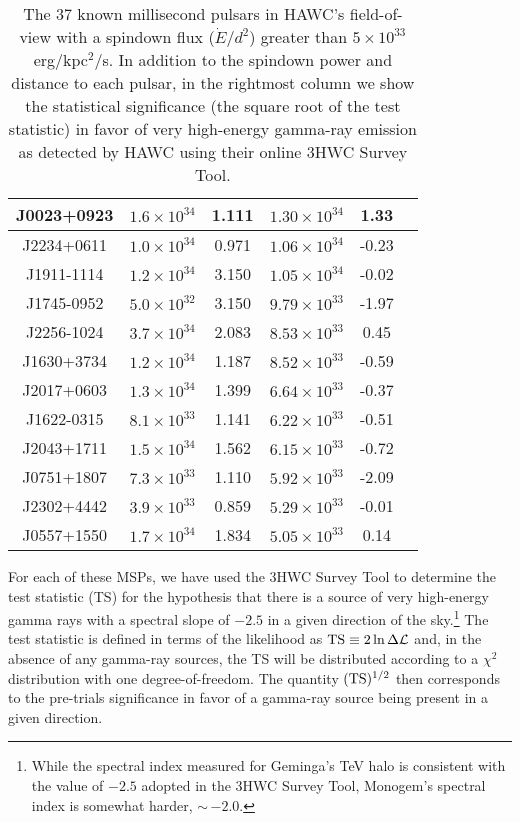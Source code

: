\documentclass[aps,prd,twocolumn,amsmath,superscriptaddress,amssymb,showpacs,floatfix,nofootinbib,longbibliography,preprintnumbers]{revtex4-1}
\begin{document}
\begin{table}[t]
\begin{tabular}{|c|c|c|c|c|c|}
\tabularnewline
\hline
J0023+0923 & $1.6\times 10^{34}$ & 1.111 & $1.30 \times 10^{34}$ & 1.33 
\tabularnewline
\hline
J2234+0611 & $1.0\times 10^{34}$ & 0.971 & $1.06 \times 10^{34}$ & -0.23 
\tabularnewline
\hline
J1911-1114 & $1.2\times 10^{34}$ & 3.150 & $1.05 \times 10^{34}$ & -0.02 
\tabularnewline
\hline
J1745-0952 & $5.0\times 10^{32}$ & 3.150 & $9.79 \times 10^{33}$ & -1.97 
\tabularnewline
\hline
J2256-1024 & $3.7\times 10^{34}$ & 2.083 & $8.53 \times 10^{33}$ & 0.45 
\tabularnewline
\hline
J1630+3734 & $1.2\times 10^{34}$ & 1.187 & $8.52 \times 10^{33}$ & -0.59 
\tabularnewline
\hline
J2017+0603 & $1.3\times 10^{34}$ & 1.399 & $6.64 \times 10^{33}$ & -0.37 
\tabularnewline
\hline
J1622-0315 & $8.1\times 10^{33}$ & 1.141 & $6.22 \times 10^{33}$ & -0.51 
\tabularnewline
\hline
J2043+1711 & $1.5\times 10^{34}$ & 1.562 & $6.15 \times 10^{33}$ & -0.72 
\tabularnewline
\hline
J0751+1807 & $7.3\times 10^{33}$ & 1.110 & $5.92 \times 10^{33}$ & -2.09 
\tabularnewline
\hline
J2302+4442 & $3.9\times 10^{33}$ & 0.859 & $5.29 \times 10^{33}$ & -0.01 
\tabularnewline
\hline 
J0557+1550 & $1.7\times 10^{34}$ & 1.834 & $5.05 \times 10^{33}$ & 0.14 
\tabularnewline
\hline
\end{tabular}
\caption{The 37 known millisecond pulsars in HAWC's field-of-view with a spindown flux ($\dot{E}/d^2$) greater than $5 \times 10^{33}$ erg/kpc$^2$/s. In addition to the spindown power and distance to each pulsar, in the rightmost column we show the statistical significance (the square root of the test statistic) in favor of very high-energy gamma-ray emission as detected by HAWC using their online 3HWC Survey Tool.}
\label{TableList}
\end{table}

For each of these MSPs, we have used the 3HWC Survey Tool to determine the test statistic (TS) for the hypothesis that there is a source of very high-energy gamma rays with a spectral slope of $-2.5$ in a given direction of the sky.\footnote{While the spectral index measured for Geminga's TeV halo is consistent with the value of $-2.5$ adopted in the 3HWC Survey Tool, Monogem's spectral index is somewhat harder, $\sim$\,$-2.0$.} The test statistic is defined in terms of the likelihood as ${\rm TS} \equiv 2 \ln \Delta \mathcal{L}$ and, in the absence of any gamma-ray sources, the TS will be distributed according to a $\chi^2$ distribution with one degree-of-freedom. The quantity $({\rm TS})^{1/2}$ then corresponds to the pre-trials significance in favor of a gamma-ray source being present in a given direction.  
\end{document}
